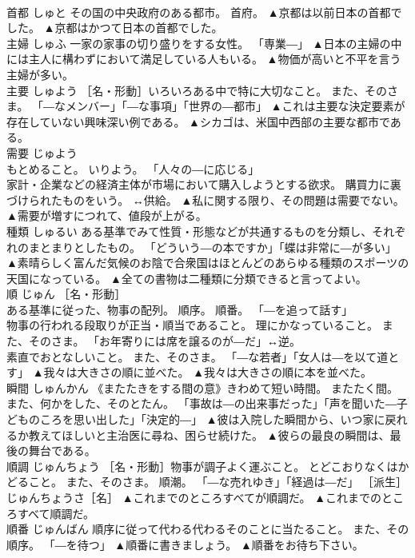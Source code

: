 \documentclass[8pt]{extreport}
\begin{document}
\begin{CJK}{UTF8}{min}
\\	首都	しゅと	その国の中央政府のある都市。 首府。	▲京都は以前日本の首都でした。 ▲京都はかつて日本の首都でした。
\\	主婦	しゅふ	一家の家事の切り盛りをする女性。 「専業―」	▲日本の主婦の中には主人に構わずにおいて満足している人もいる。 ▲物価が高いと不平を言う主婦が多い。
\\	主要	しゅよう	［名・形動］いろいろある中で特に大切なこと。 また、そのさま。 「―なメンバー」「―な事項」「世界の―都市」	▲これは主要な決定要素が存在していない興味深い例である。 ▲シカゴは、米国中西部の主要な都市である。
\\	需要	じゅよう	
\\	もとめること。 いりよう。 「人々の―に応じる」 
\\	家計・企業などの経済主体が市場において購入しようとする欲求。 購買力に裏づけられたものをいう。 ↔供給。	▲私に関する限り、その問題は需要でない。 ▲需要が増すにつれて、値段が上がる。
\\	種類	しゅるい	ある基準でみて性質・形態などが共通するものを分類し、それぞれのまとまりとしたもの。 「どういう―の本ですか」「蝶は非常に―が多い」	▲素晴らしく富んだ気候のお陰で合衆国はほとんどのあらゆる種類のスポーツの天国になっている。 ▲全ての書物は二種類に分類できると言ってよい。
\\	順	じゅん	［名・形動］ 
\\	ある基準に従った、物事の配列。 順序。 順番。 「―を追って話す」 
\\	物事の行われる段取りが正当・順当であること。 理にかなっていること。 また、そのさま。 「お年寄りには席を譲るのが―だ」↔逆。 
\\	素直でおとなしいこと。 また、そのさま。 「―な若者」「女人は―を以て道とす」	▲我々は大きさの順に並べた。 ▲我々は大きさの順に本を並べた。
\\	瞬間	しゅんかん	《またたきをする間の意》きわめて短い時間。 またたく間。 また、何かをした、そのとたん。 「事故は―の出来事だった」「声を聞いた―子どものころを思い出した」「決定的―」	▲彼は入院した瞬間から、いつ家に戻れるか教えてほしいと主治医に尋ね、困らせ続けた。 ▲彼らの最良の瞬間は、最後の舞台である。
\\	順調	じゅんちょう	［名・形動］物事が調子よく運ぶこと。 とどこおりなくはかどること。 また、そのさま。 順潮。 「―な売れゆき」「経過は―だ」 ［派生］じゅんちょうさ［名］	▲これまでのところすべてが順調だ。 ▲これまでのところすべて順調だ。
\\	順番	じゅんばん	順序に従って代わる代わるそのことに当たること。 また、その順序。 「―を待つ」	▲順番に書きましょう。 ▲順番をお待ち下さい。

\end{CJK}
\end{document}
